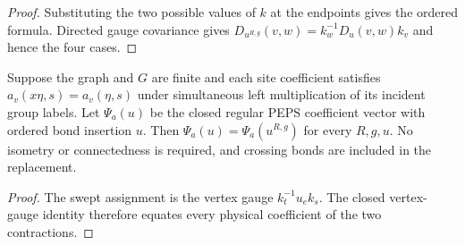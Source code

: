 \begin{proof}\leanok
    Substituting the two possible values of $k$ at the endpoints gives
    the ordered formula. Directed gauge covariance gives
    $D_{u^{R,g}}(v,w)=k_w^{-1}D_u(v,w)k_v$ and hence the four cases.
\end{proof}

\begin{lemma}%
    \label{thm:peps_regular_swept_patch_state}
    \leanok
    Suppose the graph and $G$ are finite and each site coefficient
    satisfies $a_v(x\eta,s)=a_v(\eta,s)$ under simultaneous left
    multiplication of its incident group labels.
    Let $\Psi_a(u)$ be the closed regular PEPS coefficient vector
    with ordered bond insertion $u$.
    Then $\Psi_a(u)=\Psi_a(u^{R,g})$ for every $R,g,u$.
    No isometry or connectedness is required, and crossing bonds are
    included in the replacement.
\end{lemma}

\begin{proof}\leanok
    The swept assignment is the vertex gauge $k_t^{-1}u_ek_s$.
    The closed vertex-gauge identity therefore equates every physical
    coefficient of the two contractions.
\end{proof}

